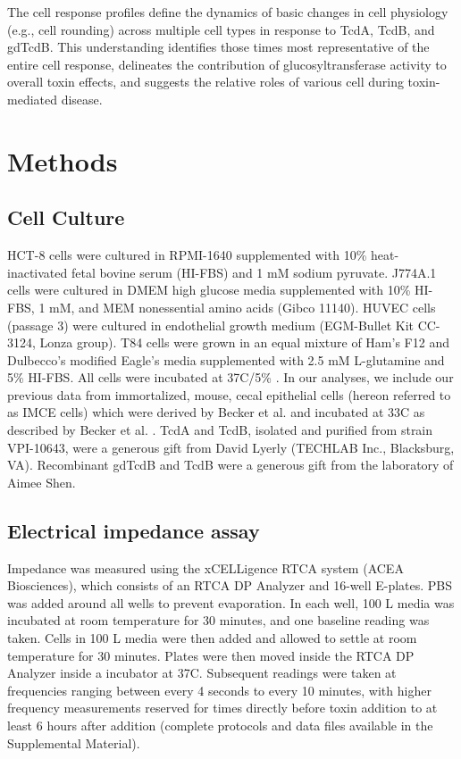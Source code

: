 The cell response profiles define the dynamics of basic 
changes in cell physiology (e.g., cell rounding) across 
multiple cell types in response to TcdA, TcdB, and gdTcdB. 
This understanding identifies those times most representative 
of the entire cell response, delineates the contribution 
of glucosyltransferase activity to overall toxin effects, 
and suggests the relative roles of various cell during 
toxin-mediated disease.

\section{Methods}

\subsection{Cell Culture}
HCT-8 cells were cultured in RPMI-1640 supplemented with 10\% 
heat-inactivated fetal bovine serum (HI-FBS) and 1 mM 
sodium pyruvate. J774A.1 cells were cultured in DMEM high 
glucose media supplemented with 10\% HI-FBS, 1 mM, and 
MEM nonessential amino acids (Gibco 11140). HUVEC cells 
(passage 3) were cultured in endothelial growth medium 
(EGM-Bullet Kit CC-3124, Lonza group). T84 cells were 
grown in an equal mixture of Ham's F12 and Dulbecco's 
modified Eagle's media supplemented with 2.5 mM L-glutamine 
and 5\% HI-FBS. All cells were incubated at 
37\textdegree{}C/5\% . In our analyses, we include 
our previous data from immortalized, mouse, cecal 
epithelial cells (hereon referred to as IMCE cells) 
which were derived by Becker et al. and incubated at 
33\textdegree{}C as described by Becker et al. \cite{DAuria:2013jo,Becker:2010io}. 
TcdA and TcdB, isolated and purified from strain VPI-10643, 
were a generous gift from David Lyerly (TECHLAB Inc., Blacksburg, VA). 
Recombinant gdTcdB and TcdB were a generous gift from the 
laboratory of Aimee Shen.

\subsection{Electrical impedance assay}
Impedance was measured using the xCELLigence RTCA 
system (ACEA Biosciences), which consists of an RTCA 
DP Analyzer and 16-well E-plates. PBS was added around 
all wells to prevent evaporation. In each well, 100 \textmugreek{}L 
media was incubated at room temperature for 30 minutes, 
and one baseline reading was taken. Cells in 100 \textmugreek{}L 
media were then added and allowed to settle at room 
temperature for 30 minutes. Plates were then moved inside 
the RTCA DP Analyzer inside a  incubator at 37\textdegree{}C. 
Subsequent readings were taken at frequencies ranging between 
every 4 seconds to every 10 minutes, with higher frequency 
measurements reserved for times directly before toxin 
addition to at least 6 hours after addition (complete 
protocols and data files available in the Supplemental Material).

